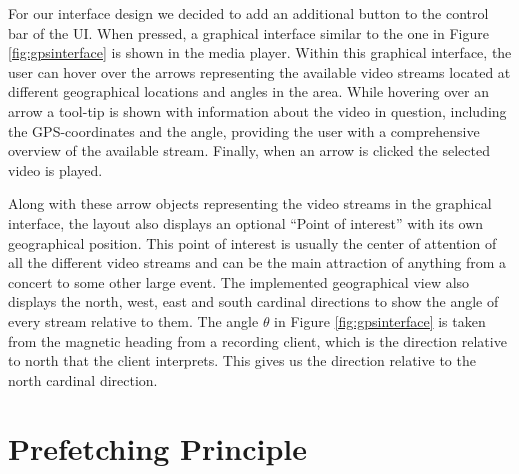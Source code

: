 For our interface design we decided to add an additional button to the control bar of the UI. When pressed, a graphical interface similar to the one in Figure \ref{fig:gpsinterface} is shown in the media player. Within this graphical interface, the user can hover over the arrows representing the available video streams located at different geographical locations and angles in the area. While hovering over an arrow a tool-tip is shown with information about the video in question, including the GPS-coordinates and the angle, providing the user with a comprehensive overview of the available stream. Finally, when an arrow is clicked the selected video is played.

Along with these arrow objects representing the video streams in the graphical interface, the layout also displays an optional “Point of interest” with its own geographical position. This point of interest is usually the center of attention of all the different video streams and can be the main attraction of anything from a concert to some other large event. The implemented geographical view also displays the north, west, east and south cardinal directions to show the angle of every stream relative to them. The angle $\theta$ in Figure \ref{fig:gpsinterface} is taken from the magnetic heading from a recording client, which is the direction relative to north that the client interprets. This gives us the direction relative to the north cardinal direction.

\section{Prefetching Principle}
\label{sec:prefetching}

